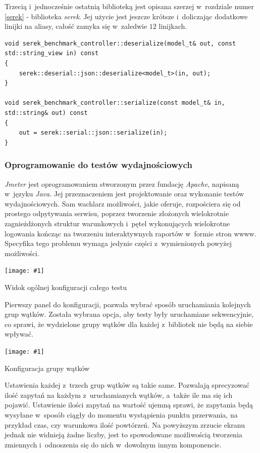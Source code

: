 \documentclass[12pt]{article}
\newcommand{\n}{\newline}
\newcommand{\putss}[3]{
\begin{captioned}[H]
	\centering
	\texttt{[image: \#1]}
	\caption{#2}
	\label{#3}
	\medskip
\end{captioned}
}
\newcommand{\nonpl}[1]{{\it #1}}
\newcommand{\Jmeter}{\nonpl{Jmeter}\texttrademark}
\newcommand{\serek}{\nonpl{serek}}
\begin{document}
{{{				Trzecią i~jednocześnie ostatnią biblioteką jest opisana szerzej w~rozdziale numer \ref{serek} - biblioteka \serek.
				Jej użycie jest jeszcze krótsze i~doliczając dodatkowe linijki na aliasy, całość zamyka się w~zaledwie $12$ linijkach.\n

				\begin{lstlisting}[frame=single]
void serek_benchmark_controller::deserialize(model_t& out, const std::string_view in) const
{
	serek::deserial::json::deserialize<model_t>(in, out);
}

void serek_benchmark_controller::serialize(const model_t& in, std::string& out) const
{
	out = serek::serial::json::serialize(in);
}
				\end{lstlisting}
			}

			{
				\subsubsection{Oprogramowanie do testów wydajnościowych}

				\Jmeter\cite{jmeter} jest oprogramowaniem stworzonym przez fundację \nonpl{Apache}, napisaną w~języku \nonpl{Java}. Jej przeznaczeniem
				jest projektowanie oraz wykonanie testów wydajnościowych. Sam wachlarz możliwości, jakie oferuje, rozpościera się od prostego odpytywania serwisu, poprzez
				tworzenie złożonych wielokrotnie zagnieżdżonych struktur warunkowych i~pętel wykonujących wielokrotne logowania kończąc na tworzeniu interaktywnych
				raportów w~formie stron wwww. Specyfika tego problemu wymaga jedynie części z~wymienionych powyżej możliwości.

				\putss{./img/jmeter_ss/main_pane.png}{ Widok ogólnej konfiguracji całego testu}{jmeter_main_config}

				Pierwszy panel do konfiguracji, pozwala wybrać sposób uruchamiania kolejnych grup wątków. Została wybrana opcja, aby testy były uruchamiane sekwencyjnie,
				co sprawi, że wydzielone grupy wątków dla każdej z~bibliotek nie będą na siebie wpływać.\n

				\putss{./img/jmeter_ss/thread_group_config.png}{ Konfiguracja grupy wątków}{jmeter_thread_config}

				Ustawienia każdej z~trzech grup wątków są takie same. Pozwalają sprecyzować ilość zapytań na każdym z~uruchamianych wątków, a~także ile ma się ich pojawić.
				Ustawienie ilości zapytań na wartość ujemną sprawi, że zapytania będą wysyłane w~sposób ciągły do momentu wystąpienia punktu przerwania, na przykład czas, czy warunkowa
				ilość powtórzeń. Na powyższym zrzucie ekranu jednak nie widnieją żadne liczby, jest to spowodowane możliwością tworzenia zmiennych i~odnoszenia się do nich w~dowolnym innym
				komponencie.\n

}}}
\end{document}
